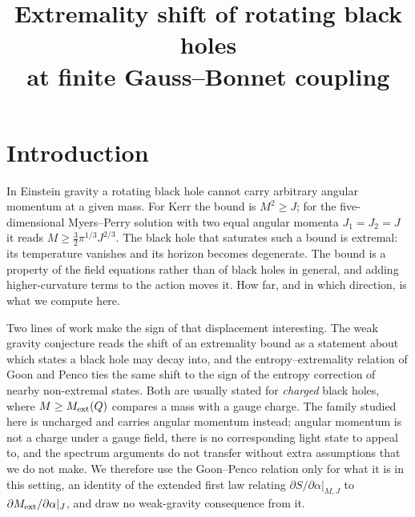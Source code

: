 \documentclass[11pt,a4paper]{article}
\title{Extremality shift of rotating black holes\\at finite Gauss--Bonnet coupling}
\begin{document}
\maketitle
\flushbottom

\section{Introduction}

In Einstein gravity a rotating black hole cannot carry arbitrary angular
momentum at a given mass. For Kerr the bound is $M^2\ge J$; for the
five-dimensional Myers--Perry solution \cite{Myers:1986un} with two equal
angular momenta $J_1=J_2=J$ it reads $M\ge\tfrac32\pi^{1/3}J^{2/3}$. The
black hole that saturates such a bound is extremal: its temperature vanishes
and its horizon becomes degenerate. The bound is a property of the field
equations rather than of black holes in general, and adding higher-curvature
terms to the action moves it. How far, and in which direction, is what we
compute here.

Two lines of work make the sign of that displacement interesting. The weak
gravity conjecture \cite{ArkaniHamed:2006dz,Kats:2006xp} reads the shift of an
extremality bound as a statement about which states a black hole may decay
into, and the entropy--extremality relation of Goon and Penco
\cite{Goon:2019faz} ties the same shift to the sign of the entropy correction
of nearby non-extremal states. Both are usually stated for \emph{charged}
black holes, where $M\ge M_{\mathrm{ext}}(Q)$ compares a mass with a gauge charge. The
family studied here is uncharged and carries angular momentum instead; angular
momentum is not a charge under a gauge field, there is no corresponding light
state to appeal to, and the spectrum arguments do not transfer without extra
assumptions that we do not make. We therefore use the Goon--Penco relation only
for what it is in this setting, an identity of the extended first law relating
$\partial S/\partial\alpha|_{M,J}$ to $\partial M_{\mathrm{ext}}/\partial\alpha|_J$, and
draw no weak-gravity consequence from it.
\end{document}
